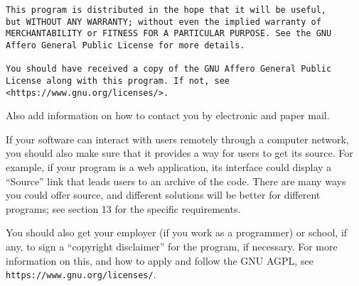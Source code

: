 \documentclass{article}%
\begin{document}
\begin{flushleft}
\begin{enumerate}
{\begin{verbatim}
This program is distributed in the hope that it will be useful, 
but WITHOUT ANY WARRANTY; without even the implied warranty of 
MERCHANTABILITY or FITNESS FOR A PARTICULAR PURPOSE. See the GNU 
Affero General Public License for more details.

You should have received a copy of the GNU Affero General Public 
License along with this program. If not, see 
<https://www.gnu.org/licenses/>.
\end{verbatim}
}

Also add information on how to contact you by electronic and paper mail.

If your software can interact with users remotely through a computer
network, you should also make sure that it provides a way for users to
get its source.  For example, if your program is a web application, its
interface could display a ``Source'' link that leads users to an archive
of the code. There are many ways you could offer source, and different
solutions will be better for different programs; see section 13 for the
specific requirements.

You should also get your employer (if you work as a programmer) or
school, if any, to sign a ``copyright disclaimer'' for the program, if
necessary. For more information on this, and how to apply and follow
the GNU AGPL, see \\
\texttt{https://www.gnu.org/licenses/}.

\end{enumerate}

\end{flushleft}
\end{document}

